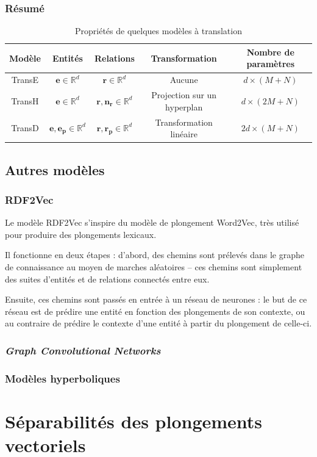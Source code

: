 \subsubsection{Résumé}


\begin{table}[ht]
\caption{Propriétés de quelques modèles à translation}
\centering
\begin{tabular}{|c|c|c|c|c|}
\hline\rowcolor[gray]{0.8}\color{black}
Modèle & Entités & Relations & Transformation & Nombre de paramètres\\\hline
TransE & $\mathbf{e} \in \mathbb{R}^d$ & $\mathbf{r} \in \mathbb{R}^d$ & Aucune & $d \times (M + N)$ \\
TransH & $\mathbf{e} \in \mathbb{R}^d$ & $\mathbf{r, n_r} \in \mathbb{R}^d$ & Projection sur un hyperplan & $d \times (2M + N)$ \\
TransD & $\mathbf{e, e_p} \in \mathbb{R}^d$ & $\mathbf{r, r_p} \in \mathbb{R}^d$  & Transformation linéaire & $2d \times (M + N)$ \\\hline
\end{tabular}
\label{tab:transx}
\end{table}

\subsection{Autres modèles}
\label{subsec:kge-models-misc}

\subsubsection{RDF2Vec}

Le modèle RDF2Vec s'inspire du modèle de plongement Word2Vec, très utilisé pour produire des plongements lexicaux.

Il fonctionne en deux étapes : d'abord, des chemins sont prélevés dans le graphe de connaissance au moyen de marches aléatoires – ces chemins sont simplement des suites d'entités et de relations connectés entre eux.


Ensuite, ces chemins sont passés en entrée à un réseau de neurones : le but de ce réseau est de prédire une entité en fonction des plongements de son contexte, ou au contraire de prédire le contexte d'une entité à partir du plongement de celle-ci.


\subsubsection{\textit{Graph Convolutional Networks}}
\subsubsection{Modèles hyperboliques}


\section{Séparabilités des plongements vectoriels}


